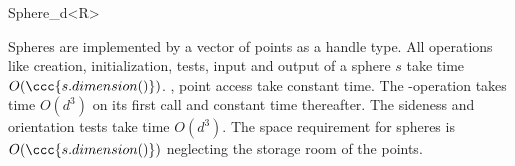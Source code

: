 \begin{ccRefClass}{Sphere_d<R>}





\ccImplementation

Spheres are implemented by a vector of points as a handle type.  All
operations like creation, initialization, tests, input and output of a
sphere $s$ take time $O(\ccc{s.dimension()})$. ,
point access take constant time.  The -operation takes
time $O(d^3)$ on its first call and constant time thereafter. The
sideness and orientation tests take time $O(d^3)$.  The space
requirement for spheres is $O(\ccc{s.dimension()})$ neglecting the
storage room of the points.

\end{ccRefClass}


